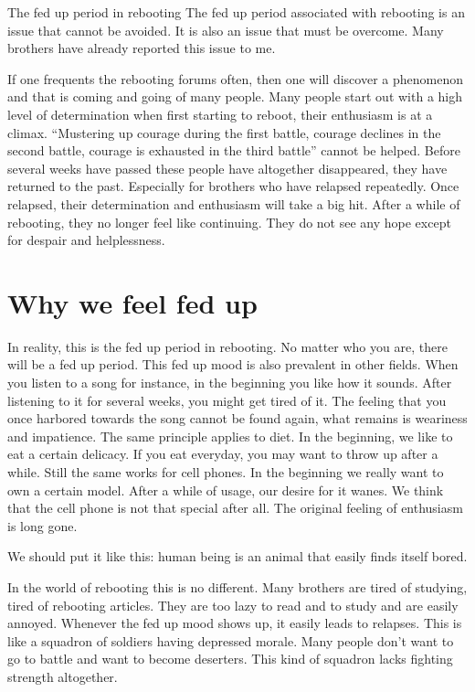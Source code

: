 \documentclass[
]{book}
\begin{document}
The fed up period in rebooting
The fed up period associated with rebooting is an issue that cannot be avoided. It is also an issue that must be overcome. Many brothers have already reported this issue to me.

If one frequents the rebooting forums often, then one will discover a phenomenon and that is coming and going of many people. Many people start out with a high level of determination when first starting to reboot, their enthusiasm is at a climax. ``Mustering up courage during the first battle, courage declines in the second battle, courage is exhausted in the third battle'' cannot be helped. Before several weeks have passed these people have altogether disappeared, they have returned to the past. Especially for brothers who have relapsed repeatedly. Once relapsed, their determination and enthusiasm will take a big hit. After a while of rebooting, they no longer feel like continuing. They do not see any hope except for despair and helplessness.

\hypertarget{why-we-feel-fed-up}{%
\section{Why we feel fed up}\label{why-we-feel-fed-up}}

In reality, this is the fed up period in rebooting. No matter who you are, there will be a fed up period. This fed up mood is also prevalent in other fields. When you listen to a song for instance, in the beginning you like how it sounds. After listening to it for several weeks, you might get tired of it. The feeling that you once harbored towards the song cannot be found again, what remains is weariness and impatience. The same principle applies to diet. In the beginning, we like to eat a certain delicacy. If you eat everyday, you may want to throw up after a while. Still the same works for cell phones. In the beginning we really want to own a certain model. After a while of usage, our desire for it wanes. We think that the cell phone is not that special after all. The original feeling of enthusiasm is long gone.

We should put it like this: human being is an animal that easily finds itself bored.

In the world of rebooting this is no different. Many brothers are tired of studying, tired of rebooting articles. They are too lazy to read and to study and are easily annoyed. Whenever the fed up mood shows up, it easily leads to relapses. This is like a squadron of soldiers having depressed morale. Many people don't want to go to battle and want to become deserters. This kind of squadron lacks fighting strength altogether.
\end{document}
